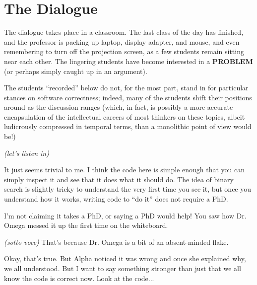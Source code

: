 \documentclass[sigplan]{acmart}
\begin{document}
\maketitle


\section{The Dialogue}

The dialogue takes place in a classroom.  The last class of the day
has finished, and the professor is packing up laptop, 
display adapter, and mouse, and even remembering to turn off the
projection screen, as a few students remain sitting near each other.
The lingering students have become interested in a {\bf PROBLEM} (or
perhaps simply caught up in an argument).

The students ``recorded'' below do not, for the most part, stand in for particular stances
on software correctness; indeed, many of the students shift their
positions around as the discussion ranges (which, in fact, is possibly
a more accurate encapsulation of the intellectual careers of most
thinkers on these topics, albeit ludicrously compressed in temporal
terms, than a monolithic point of view would be!)

\vspace{0.1in}

\emph{(let's listen in)}

\vspace{0.1in}

  It just seems trivial to me.  I think the code here is simple enough that you can simply inspect it and see that it does what it should do.  The idea of binary search is slightly tricky to understand the very first time you see it, but once you understand how it works, writing code to ``do it'' does not require a PhD.

\vspace{0.1in}

  I'm not claiming it takes a PhD, or saying a PhD would help!  You saw how Dr. Omega messed it up the first time on the whiteboard.

\vspace{0.1in}

 \emph{(sotto voce)} That's because
Dr. Omega is a bit of an absent-minded flake.

\vspace{0.1in}

  Okay, that's true.  But Alpha noticed it
was wrong and once she explained why, we all understood.  But I want
to say something stronger than just that we all know the code is
correct now.  Look at the code...
\end{document}
